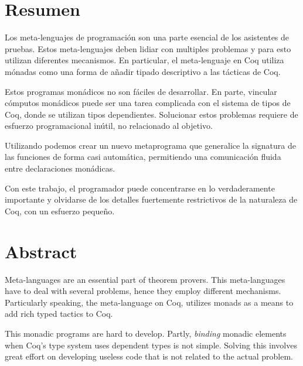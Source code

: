 \begingroup
\let\clearpage\relax
\let\cleardoublepage\relax
\let\cleardoublepage\relax



\chapter*{Resumen}

Los meta-lenguajes de programación son una parte esencial de los asistentes de pruebas. Estos meta-lenguajes deben lidiar con multiples problemas y para esto utilizan diferentes mecanismos. En particular, el meta-lenguaje \Mtac en Coq utiliza mónadas como una forma de añadir tipado descriptivo a las tácticas de Coq.

Estos programas monádicos no son fáciles de desarrollar.
En parte, vincular cómputos monádicos puede ser una tarea complicada con el sistema de tipos de Coq, donde se utilizan tipos dependientes.
Solucionar estos problemas requiere de esfuerzo programacional inútil, no relacionado al objetivo.

Utilizando \mtac podemos crear un nuevo metaprograma que generalice la signatura de las funciones de forma casi automática, permitiendo una comunicación fluida entre declaraciones monádicas. %

Con este trabajo, el programador puede concentrarse en lo verdaderamente importante y olvidarse de los detalles fuertemente restrictivos de la naturaleza de Coq, con un esfuerzo pequeño.

\chapter*{Abstract}

Meta-languages are an essential part of theorem provers. This meta-languages have to deal with several problems, hence they employ different mechanisms.
Particularly speaking, the meta-language \Mtac on Coq, utilizes monads as a means to add rich typed tactics to Coq.

This monadic programs are hard to develop. Partly, \textit{binding} monadic elements when Coq's type system uses dependent types is not simple.
Solving this involves great effort on developing useless code that is not related to the actual problem.

